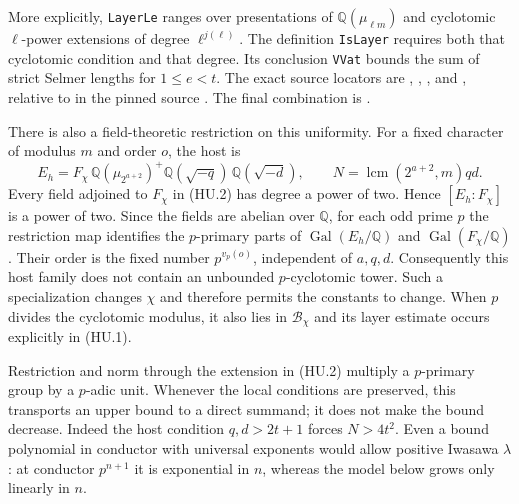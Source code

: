 \documentclass[11pt,a4paper]{article}
\theoremstyle{definition}
\begin{document}
More explicitly, \texttt{LayerLe} ranges over presentations of
$\mathbb Q(\mu_{\ell m})$ and cyclotomic $\ell$-power extensions of
degree $\ell^{j(\ell)}$.  The definition \texttt{IsLayer} requires
both that cyclotomic condition and that degree.  Its conclusion
\texttt{VVat} bounds the sum of strict Selmer lengths for $1\le e<t$.
The exact source locators are
,
,
, and
, relative to
in the pinned source \cite{K17PinnedLeanMirror}.
The final combination is
.

There is also a field-theoretic restriction on this uniformity.
For a fixed character of modulus $m$ and order $o$, the host is
\[
 E_h=F_\chi\,\mathbb Q(\mu_{2^{a+2}})^+
           \mathbb Q(\sqrt{-q})\,\mathbb Q(\sqrt{-d}),
 \qquad N=\operatorname{lcm}(2^{a+2},m)qd.
 \tag{HU.2}
\]
Every field adjoined to $F_\chi$ in (HU.2) has degree a power of
two.  Hence $[E_h:F_\chi]$ is a power of two.  Since the fields
are abelian over $\mathbb Q$, for each odd prime $p$ the restriction
map identifies the $p$-primary parts of
$\operatorname{Gal}(E_h/\mathbb Q)$ and
$\operatorname{Gal}(F_\chi/\mathbb Q)$.  Their order is the fixed
number $p^{v_p(o)}$, independent of $a,q,d$.
Consequently this host family does not contain an unbounded
$p$-cyclotomic tower.  Such a specialization changes $\chi$ and
therefore permits the constants to change.  When $p$ divides the
cyclotomic modulus, it also lies in $\mathcal B_\chi$ and its layer
estimate occurs explicitly in (HU.1).

Restriction and norm through the extension in (HU.2) multiply a
$p$-primary group by a $p$-adic unit.  Whenever the local conditions
are preserved, this transports an upper bound to a direct summand;
it does not make the bound decrease.  Indeed the host condition
$q,d>2t+1$ forces $N>4t^2$.
Even a bound polynomial in conductor with universal exponents
would allow positive Iwasawa $\lambda$: at conductor $p^{n+1}$
it is exponential in $n$, whereas the model below grows only
linearly in $n$.
\end{document}
